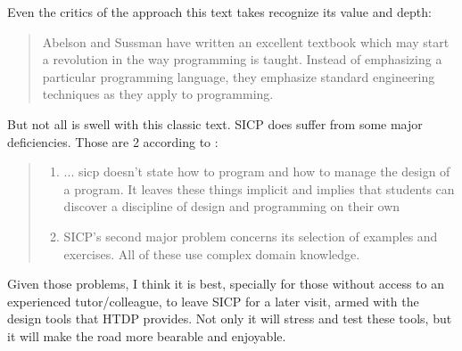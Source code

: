 Even the critics of the approach this text takes recognize its value and
depth\cite{education:wadler__a_critique_of_abelson_and_sussman}:

\begin{quotation}
    Abelson and Sussman have written an excellent textbook  which may start a
    revolution in the way programming is taught.
    Instead of emphasizing a particular programming language, they emphasize standard
    engineering techniques as they apply to programming.
\end{quotation}

But not all is swell with this classic text. SICP does suffer from some
major deficiencies. Those are 2 according to \cite{education:felleisen__sicsc}:

\begin{quote}
    \begin{enumerate}
        \item ... sicp doesn’t state how to program and how to manage the design
        of a program. It leaves these things implicit and implies that students
        can discover a discipline of design and programming on their own

        \item SICP’s second major problem concerns its selection of examples and
        exercises. All of these use complex domain knowledge.
    \end{enumerate}
\end{quote}

Given those problems, I think it is best, specially for those without access to
an experienced tutor/colleague, to leave SICP for a later visit, armed with the
design tools that HTDP provides. Not only it will stress and test these tools,
but it will make the road more bearable and enjoyable.
